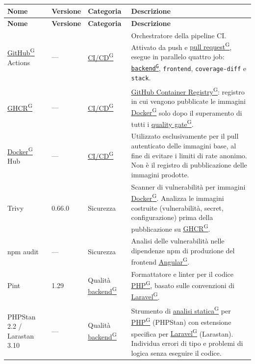\documentclass[a4paper,12pt]{article}
\providecommand{\glslink}[2]{\href{https://alittlebyte-19.github.io/Documentazione/glossario.html\#gls-#1}{\underline{#2}\textsuperscript{\scriptsize G}}}
\begin{document}
\renewcommand{\arraystretch}{1.3}
{\small
\setlength{\LTleft}{0pt}
\setlength{\LTright}{0pt}
\begin{longtable}{|p{3.5cm}|p{1.8cm}|p{2.5cm}|p{6.7cm}|}
    \hline
    \rowcolor{gray!20}
    \textbf{Nome} & \textbf{Versione} & \textbf{Categoria} & \textbf{Descrizione} \\
    \hline
    \endfirsthead
    \hline
    \rowcolor{gray!20}
    \textbf{Nome} & \textbf{Versione} & \textbf{Categoria} & \textbf{Descrizione} \\
    \hline
    \endhead
    \glslink{github}{GitHub} Actions & --- & \glslink{ci-cd-continuous-integration-continuous-deployment}{CI/CD} & Orchestratore della pipeline CI. Attivato da push e \glslink{pull-request}{pull request}, esegue in parallelo quattro job: \texttt{\glslink{backend}{backend}}, \texttt{frontend}, \texttt{coverage-diff} e \texttt{stack}. \\
    \hline
    \glslink{ghcr-github-container-registry}{GHCR} & --- & \glslink{ci-cd-continuous-integration-continuous-deployment}{CI/CD} & \glslink{ghcr-github-container-registry}{GitHub Container Registry}: registro in cui vengono pubblicate le immagini \glslink{docker}{Docker} solo dopo il superamento di tutti i \glslink{quality-gate}{quality gate}. \\
    \hline
    \glslink{docker}{Docker} Hub & --- & \glslink{ci-cd-continuous-integration-continuous-deployment}{CI/CD} & Utilizzato esclusivamente per il pull autenticato delle immagini base, al fine di evitare i limiti di rate anonimo. Non è il registro di pubblicazione delle immagini prodotte. \\
    \hline
    Trivy & 0.66.0 & Sicurezza & Scanner di vulnerabilità per immagini \glslink{docker}{Docker}. Analizza le immagini costruite (vulnerabilità, secret, configurazione) prima della pubblicazione su \glslink{ghcr-github-container-registry}{GHCR}. \\
    \hline
    npm audit & --- & Sicurezza & Analisi delle vulnerabilità nelle dipendenze npm di produzione del frontend \glslink{angular}{Angular}. \\
    \hline
    Pint & 1.29 & Qualità \glslink{backend}{backend} & Formattatore e linter per il codice \glslink{php}{PHP}, basato sulle convenzioni di \glslink{laravel}{Laravel}. \\
    \hline
    PHPStan 2.2 / Larastan 3.10 & --- & Qualità \glslink{backend}{backend} & Strumento di \glslink{analisi-statica}{analisi statica} per \glslink{php}{PHP} (PHPStan) con estensione specifica per \glslink{laravel}{Laravel} (Larastan). Individua errori di tipo e problemi di logica senza eseguire il codice. \\

\end{longtable}}
\end{document}
